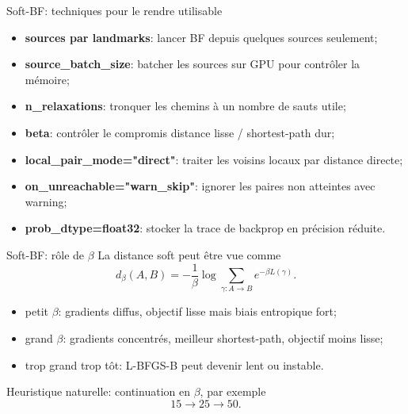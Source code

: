 \documentclass[aspectratio=169]{beamer}
\begin{document}
\begin{frame}{Soft-BF: techniques pour le rendre utilisable}
  \begin{itemize}
    \item \textbf{sources par landmarks}: lancer BF depuis quelques sources seulement;
    \item \textbf{source\_batch\_size}: batcher les sources sur GPU pour contrôler la mémoire;
    \item \textbf{n\_relaxations}: tronquer les chemins à un nombre de sauts utile;
    \item \textbf{beta}: contrôler le compromis distance lisse / shortest-path dur;
    \item \textbf{local\_pair\_mode="direct"}: traiter les voisins locaux par distance directe;
    \item \textbf{on\_unreachable="warn\_skip"}: ignorer les paires non atteintes avec warning;
    \item \textbf{prob\_dtype=float32}: stocker la trace de backprop en précision réduite.
  \end{itemize}
\end{frame}

\begin{frame}{Soft-BF: rôle de \texorpdfstring{$\beta$}{beta}}
  La distance soft peut être vue comme
  \[
    d_\beta(A,B)
    =
    -\frac{1}{\beta}
    \log
    \sum_{\gamma:A\to B}
    e^{-\beta L(\gamma)} .
  \]

  \vspace{0.2cm}
  \begin{itemize}
    \item petit $\beta$: gradients diffus, objectif lisse mais biais entropique fort;
    \item grand $\beta$: gradients concentrés, meilleur shortest-path, objectif moins lisse;
    \item trop grand trop tôt: L-BFGS-B peut devenir lent ou instable.
  \end{itemize}

  \vspace{0.2cm}
  Heuristique naturelle: continuation en $\beta$, par exemple
  \[
    15 \rightarrow 25 \rightarrow 50 .
  \]
\end{frame}
\end{document}
